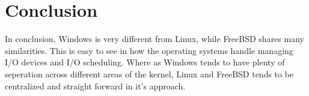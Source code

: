 \documentclass[journal,letterpaper,draftclsnofoot,onecolumn,10pt]{IEEEtran}
\begin{document}
\section{Conclusion}
In conclusion, Windows is very different from Linux, while FreeBSD shares many similarities. This is easy to see in how the operating systems handle managing I/O devices and I/O scheduling. Where as Windows tends to have plenty of seperation across different areas of the kernel, Linux and FreeBSD tends to be centralized and straight forward in it's approach.

\vfill

\pagebreak




\end{document}
